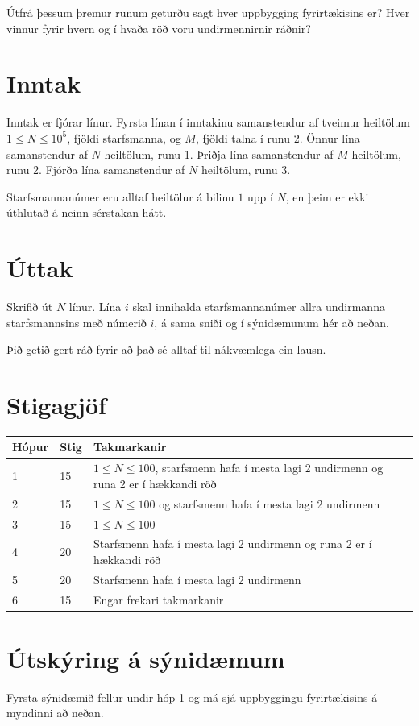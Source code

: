 Útfrá þessum þremur runum geturðu sagt hver uppbygging fyrirtækisins er?
Hver vinnur fyrir hvern og í hvaða röð voru undirmennirnir ráðnir?

\section*{Inntak}
Inntak er fjórar línur.
Fyrsta línan í inntakinu samanstendur af tveimur heiltölum $1 \leq N \leq 10^{5}$, fjöldi starfsmanna, og $M$, fjöldi talna í runu 2.
Önnur lína samanstendur af $N$ heiltölum, runu 1.
Þriðja lína samanstendur af $M$ heiltölum, runu 2.
Fjórða lína samanstendur af $N$ heiltölum, runu 3.

Starfsmannanúmer eru alltaf heiltölur á bilinu $1$ upp í $N$, en þeim er ekki
úthlutað á neinn sérstakan hátt.

\section*{Úttak}
Skrifið út $N$ línur.
Lína $i$ skal innihalda starfsmannanúmer allra undirmanna starfsmannsins með
númerið $i$, á sama sniði og í sýnidæmunum hér að neðan.

Þið getið gert ráð fyrir að það sé alltaf til nákvæmlega ein lausn.

\section*{Stigagjöf}
\begin{tabular}{|l|l|l|}
\hline
Hópur & Stig & Takmarkanir \\ \hline
1     & 15   & $1 \leq N \leq 100$, starfsmenn hafa í mesta lagi 2 undirmenn og runa 2 er í hækkandi röð \\ \hline
2     & 15   & $1 \leq N \leq 100$ og starfsmenn hafa í mesta lagi 2 undirmenn \\ \hline
3     & 15   & $1 \leq N \leq 100$ \\ \hline
4     & 20   & Starfsmenn hafa í mesta lagi 2 undirmenn og runa 2 er í hækkandi röð \\ \hline
5     & 20   & Starfsmenn hafa í mesta lagi 2 undirmenn \\ \hline
6     & 15   & Engar frekari takmarkanir\\ \hline
\end{tabular}

\section*{Útskýring á sýnidæmum}
Fyrsta sýnidæmið fellur undir hóp 1 og má sjá uppbyggingu fyrirtækisins á myndinni að neðan.

